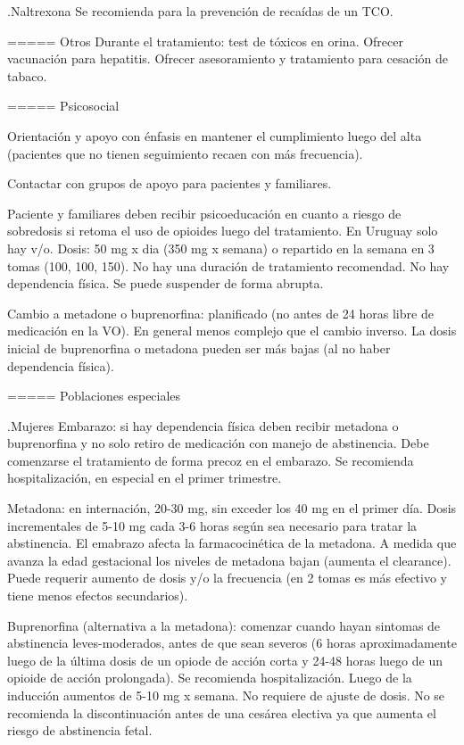 .Naltrexona
Se recomienda para la prevención de recaídas de un TCO.

===== Otros
Durante el tratamiento: test de tóxicos en orina.
Ofrecer vacunación para hepatitis.
Ofrecer asesoramiento y tratamiento para cesación de tabaco.

===== Psicosocial

Orientación y apoyo con énfasis en mantener el cumplimiento luego del alta (pacientes que no tienen seguimiento recaen con más frecuencia).

Contactar con grupos de apoyo para pacientes y familiares.

Paciente y familiares deben recibir psicoeducación en cuanto a riesgo de sobredosis si retoma el uso de opioides luego del tratamiento. En Uruguay solo hay v/o.
Dosis: 50 mg x dia (350 mg x semana) o repartido en la semana en 3 tomas (100, 100, 150).
No hay una duración de tratamiento recomendad. No hay dependencia física. Se puede suspender de forma abrupta.

Cambio a metadone o buprenorfina: planificado (no antes de 24 horas libre de medicación en la VO). En general menos complejo que el cambio inverso. La dosis inicial de buprenorfina o metadona pueden ser más bajas (al no haber dependencia física).

===== Poblaciones especiales

.Mujeres
Embarazo: si hay dependencia física deben recibir metadona o buprenorfina y no solo retiro de medicación con manejo de abstinencia. Debe comenzarse el tratamiento de forma precoz en el embarazo. Se recomienda hospitalización, en especial en el primer trimestre.

Metadona: en internación, 20-30 mg, sin exceder los 40 mg en el primer día. Dosis incrementales de 5-10 mg cada 3-6 horas según sea necesario para tratar la abstinencia. El emabrazo afecta la farmacocinética de la metadona. A medida que avanza la edad gestacional los niveles de metadona bajan (aumenta el clearance). Puede requerir aumento de dosis y/o la frecuencia (en 2 tomas es más efectivo y tiene menos efectos secundarios).

Buprenorfina (alternativa a la metadona): comenzar cuando hayan sintomas de abstinencia leves-moderados, antes de que sean severos (6 horas aproximadamente luego de la última dosis de un opiode de acción corta y 24-48 horas luego de un opioide de acción prolongada). Se recomienda hospitalización. Luego de la inducción aumentos de 5-10 mg x semana. No requiere de ajuste de dosis. No se recomienda la discontinuación antes de una cesárea electiva ya que aumenta el riesgo de abstinencia fetal.

